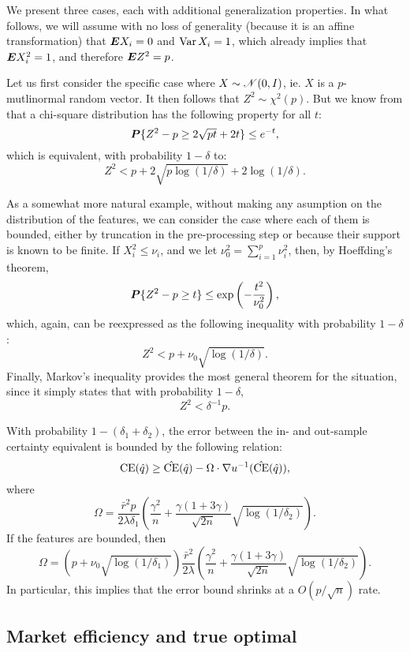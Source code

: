 We present three cases, each with additional generalization properties. In what follows,
we will assume with no loss of generality (because it is an affine transformation) that
$\bm E X_i=0$ and $\operatorname{Var} X_i = 1$, which already implies that $\bm E X_i^2=1$, and therefore
$\bm E Z^2=p$.


Let us first consider the specific case where $X\sim\mathscr{N}(0,I)$, ie. $X$ is a
$p$-mutlinormal random vector. It then follows that $Z^2\sim\chi^2(p)$. But we know from
\cite{laurent2000adaptive} that a chi-square distribution has the following property for
all $t$:
\[
\bm P\{Z^2-p \geq 2\sqrt{pt} + 2t\} \leq e^{-t},
\] 
which is equivalent, with probability $1-\delta$ to:
\[
  Z^2 < p + 2\sqrt{p\log(1/\delta)} + 2\log(1/\delta).
\]


As a somewhat more natural example, without making any asumption on the distribution of
the features, we can consider the case where each of them is bounded, either by truncation
in the pre-processing step or because their support is known to be finite. If
$X_i^2 \leq \nu_i$, and we let $\nu^2_0 = \sum_{i=1}^p \nu_i^2$, then, by Hoeffding's
theorem,
\[
  \bm P\{Z^2 - p\geq t\} \leq \exp\left(-\frac{t^2}{\nu_0^2}\right),
\]
which, again, can be reexpressed as the following inequality with probability $1-\delta$:
\[
  Z^2 < p + \nu_0\sqrt{\log(1/\delta)}.
\]
Finally, Markov's inequality provides the most general theorem for the situation, since it
simply states that with probability $1-\delta$, 
\[
  Z^2 < \delta^{-1}p.
\]
\begin{thm}
  With probability $1-(\delta_1+\delta_2)$, the error between the in- and out-sample certainty
  equivalent is bounded by the following relation:
  \[
    \operatorname{CE}(\hat q) \geq \hat{\operatorname{CE}}(\hat q) - \Omega\cdot\nabla u^{-1}(\hat{\operatorname{CE}}(\hat q)),
  \]
  where
  \[
    \Omega = \frac{\bar r^2p}{2\lambda\delta_1} \left(\frac{\gamma^2}{n} + \frac{\gamma(1+3\gamma)}{\sqrt{2n}}\sqrt{\log(1/\delta_2)}\right).
  \]
  If the features are bounded, then 
  \[
    \Omega = (p+\nu_0\sqrt{\log(1/\delta_1)})\frac{\bar r^2}{2\lambda} \left(\frac{\gamma^2}{n} + \frac{\gamma(1+3\gamma)}{\sqrt{2n}}\sqrt{\log(1/\delta_2)}\right).
  \]
In particular, this implies that the error bound shrinks at a $O(p/\sqrt{n})$ rate. 
\end{thm}

\subsection{Market efficiency and true optimal}

